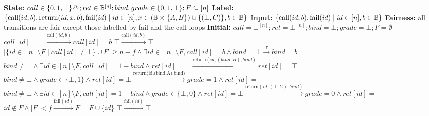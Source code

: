 \begin{transys}
    \label{PLTS:GBCA}
    \caption{Encoding of \textsf{GBCA}}
    \begin{algorithmic}
        \State \textbf{State:} $call \in \{0,1,\bot\}^{[n]}; ret \in \mathbb{B}^{[n]};
        bind, grade \in \{0,1,\bot\}; F \subseteq [n]$
        \State \textbf{Label:} $\{\text{call}(id,b), \text{return}(id,x,b), \text{fail}(id) \mid
        id \in [n], x \in (\mathbb{B} \times \{A,B\})\cup\{(\bot,C)\}, b \in \mathbb{B}\}$
        \State \textbf{Input:} $\{\text{call}(id,b), \text{fail}(id) \mid id \in [n], b \in \mathbb{B}\}$
        \State \textbf{Fairness:} all transitions are fair except those labelled by fail and the
        call loops
        \State \textbf{Initial:} $call = \bot^{[n]}; ret = \bot^{[n]}; bind = \bot; grade = \bot;
        F = \emptyset$
        \medskip
        \State
        $call[id] = \bot
        \xrightarrow{\text{call}(id,b)}
        call[id] = b$
        \State
        $\top
        \xrightarrow{\text{call}(id,b)}
        \top$ 
        \State
        $|\{id \in [n] \setminus F \mid call[id] \ne \bot\} \cup F| \ge n-f
        \wedge \exists id \in [n] \setminus F, call[id] = b
        \wedge bind = \bot
        \xrightarrow{\tau}
        bind = b$
        \State
        $bind \ne \bot
        \wedge \exists id \in [n] \setminus F, call[id] = 1-bind
        \wedge ret[id] = \bot
        \xrightarrow{\text{return}(id,(bind,B),bind)}
        ret[id] = \top$
        \State
        $bind \ne \bot \wedge grade \in \{\bot,1\} \wedge ret[id] = \bot
        \xrightarrow{\text{return(id,(bind,A),bind)}}
        grade = 1 \wedge ret[id] = \top$
        \State
        $bind \ne \bot
        \wedge \exists id \in [n] \setminus F, call[id] = 1-bind
        \wedge grade \in \{\bot,0\} \wedge ret[id] = \bot
        \xrightarrow{\text{return}(id,(\bot,C),bind)}
        grade = 0 \wedge ret[id] = \top$
        \State
        $id \not\in F \wedge |F| < f
        \xrightarrow{\text{fail}(id)}
        F = F \cup \{id\}$
        \State
        $\top
        \xrightarrow{\text{fail}(id)}
        \top$ 
    \end{algorithmic}
\end{transys}

